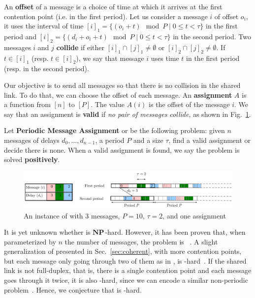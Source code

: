 \documentclass[pdflatex,sn-mathphys,iicol]{sn-jnl}%
\theoremstyle{thmstyleone}%
\theoremstyle{thmstyletwo}%
\theoremstyle{thmstylethree}%
\begin{document}
An \textbf{offset} of a message is a choice of time at which it arrives at the first contention point (i.e. in the first period). Let us consider a message $i$ of offset $o_i$, it uses the interval of time $[i]_1 = \{ (o_i + t) \mod P \mid 0 \leq t < \tau \}$ in the first period and $[i]_2 = \{ (d_i + o_i + t) \mod P \mid 0 \leq t < \tau \}$ in the second period. Two messages $i$ and $j$ \textbf{collide} if either $[i]_1 \cap [j]_1 \neq \emptyset $ or $[i]_2 \cap [j]_2 \neq \emptyset $. If $t \in [i]_1$ (resp. $t \in [i]_2$), we say that message $i$ uses time $t$ in the first period (resp. in the second period).
 
Our objective is to send all messages so that there is no collision in the shared link.
To do that, we can choose the offset of each message. An \textbf{assignment} $A$ is a function from $[n]$ to $[P]$. The value $A(i)$ is the offset of the message $i$. We say that an assignment is \textbf{valid} if \emph{no pair of messages collide}, as shown in Fig.~\ref{fig:assignment}.

Let \textbf{Periodic Message Assignment} or \pma be the following problem: given $n$ messages of delays $d_0,\dots,d_{n-1}$, a period $P$ and a size $\tau$, find a valid assignment or decide there is none. When a valid assignment is found, we say the problem is solved \textbf{positively}.

\begin{figure}
\begin{center}
\includegraphics[scale=0.7]{instance}
\end{center}
\caption{An instance of \pma with $3$ messages, $P= 10$, $\tau = 2$, and one assignment}
\label{fig:assignment}
\end{figure}

It is yet unknown whether \pma is $\textbf{NP}$-hard. However, it has been proven that, when parameterized by $n$ the number of messages, the problem is \FPT~\cite{barth2018deterministic}. A slight generalization of \pma presented in Sec.~\ref{sec:coherent}, with more contention points, but each message only going through two of them as in \pma, is \NP-hard~\cite{barth2018deterministic}. If the shared link is not full-duplex, that is, there is a single contention point and each message goes through it twice, it is also \NP-hard, since we can encode a similar non-periodic problem~\cite{orman1997complexity}. Hence, we conjecture that \pma is \NP-hard.
	
\end{document}
